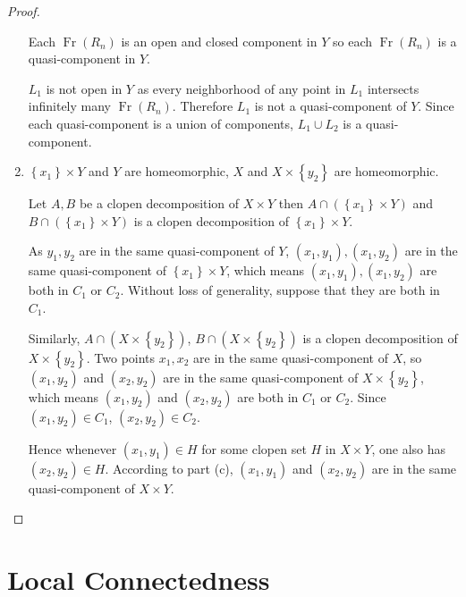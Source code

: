 \begin{proof}
\begin{enumerate}[label={(\alph*)}]
		      \bigskip
		      Each \( \operatorname{Fr}(R_{n}) \) is an open and closed component in \( Y \) so each \( \operatorname{Fr}(R_{n}) \) is a quasi-component in \( Y \).

		      \( L_{1} \) is not open in \( Y \) as every neighborhood of any point in \( L_{1} \) intersects infinitely many \( \operatorname{Fr}(R_{n}) \). Therefore \( L_{1} \) is not a quasi-component of \( Y \). Since each quasi-component is a union of components, \( L_{1} \cup L_{2} \) is a quasi-component.
		\item \( \left\{ x_{1} \right\} \times Y \) and \( Y \) are homeomorphic, \( X \) and \( X \times \left\{ y_{2} \right\} \) are homeomorphic.

		      Let \( A, B \) be a clopen decomposition of \( X \times Y \) then \( A \cap (\left\{ x_{1} \right\} \times Y) \) and \( B \cap (\left\{ x_{1} \right\} \times Y) \) is a clopen decomposition of \( \left\{ x_{1} \right\} \times Y \).

		      As \( y_{1}, y_{2} \) are in the same quasi-component of \( Y \), \( (x_{1}, y_{1}), (x_{1}, y_{2}) \) are in the same quasi-component of \( \left\{ x_{1} \right\} \times Y \), which means \( (x_{1}, y_{1}), (x_{1}, y_{2}) \) are both in \( C_{1} \) or \( C_{2} \). Without loss of generality, suppose that they are both in \( C_{1} \).

		      Similarly, \( A \cap (X \times \left\{ y_{2} \right\}) \), \( B \cap (X \times \left\{ y_{2} \right\}) \) is a clopen decomposition of \( X \times \left\{ y_{2} \right\} \). Two points \( x_{1}, x_{2} \) are in the same quasi-component of \( X \), so \( (x_{1}, y_{2}) \) and \( (x_{2}, y_{2}) \) are in the same quasi-component of \( X \times \left\{ y_{2} \right\} \), which means \( (x_{1}, y_{2}) \) and \( (x_{2}, y_{2}) \) are both in \( C_{1} \) or \( C_{2} \). Since \( (x_{1}, y_{2}) \in C_{1} \), \( (x_{2}, y_{2}) \in C_{2} \).

		      Hence whenever \( (x_{1}, y_{1}) \in H \) for some clopen set \( H \) in \( X \times Y \), one also has \( (x_{2}, y_{2}) \in H \). According to part (c), \( (x_{1}, y_{1}) \) and \( (x_{2}, y_{2}) \) are in the same quasi-component of \( X \times Y \).
	\end{enumerate}
\end{proof}

\section{Local Connectedness}

